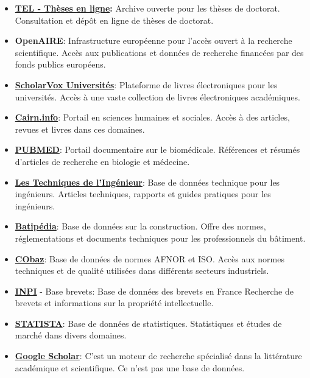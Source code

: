 \documentclass[review]{elsarticle}
\begin{document}
\begin{itemize}
\begin{itemize}
\item \textbf{\href{https://theses.hal.science/}{TEL - Thèses en ligne}:} Archive ouverte pour les thèses de doctorat. Consultation et dépôt en ligne de thèses de doctorat.

\item \textbf{OpenAIRE}: Infrastructure européenne pour l'accès ouvert à la recherche scientifique. Accès aux publications et données de recherche financées par des fonds publics européens.

\item \href{https://www.techniques-ingenieur.fr/}{\textbf{ScholarVox Universités}}: Plateforme de livres électroniques pour les universités. Accès à une vaste collection de livres électroniques académiques.

\item \textbf{\href{https://www.cairn.info/}{Cairn.info}}: Portail en sciences humaines et sociales. Accès à des articles, revues et livres dans ces domaines.

\item \href{https://pubmed.ncbi.nlm.nih.gov/}{\textbf{PUBMED}}: Portail documentaire sur le biomédicale. Références et résumés d'articles de recherche en biologie et médecine.

\item \textbf{\href{https://www.techniques-ingenieur.fr/}{Les Techniques de l'Ingénieur}}: Base de données technique pour les ingénieurs. Articles techniques, rapports et guides pratiques pour les ingénieurs.

\item \textbf{\href{https://www.batipedia.com/}{Batipédia}}: Base de données sur la construction. Offre des normes, réglementations et documents techniques pour les professionnels du bâtiment.

\item \textbf{\href{https://cobaz.afnor.org/}{CObaz}}: Base de données de normes AFNOR et ISO.  Accès aux normes techniques et de qualité utilisées dans différents secteurs industriels.

\item \textbf{\href{https://data.inpi.fr/recherche_avancee/brevets}{INPI} }- Base brevets: Base de données des brevets en France  Recherche de brevets et informations sur la propriété intellectuelle.

\item \textbf{\href{https://fr.statista.com/}{STATISTA}}: Base de données de statistiques. Statistiques et études de marché dans divers domaines.

        \item \textbf{\href{https://scholar.google.com/}{Google Scholar}}: C'est un moteur de recherche spécialisé dans la littérature académique et scientifique. Ce n'est pas une base de données. 
    \end{itemize}
\end{itemize}
\end{document}
